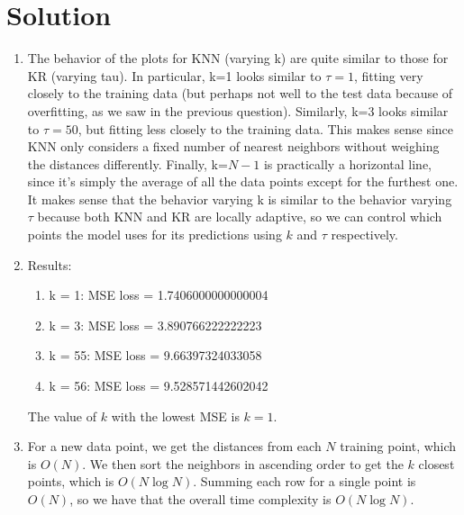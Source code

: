 \documentclass[submit]{harvardml}
\newenvironment{solution}
  {\color{magenta}\section*{Solution}}
{}
\begin{document}
\begin{solution}
\begin{enumerate}
    \item The behavior of the plots for KNN (varying k) are quite similar to those for KR (varying tau). In particular, k=1 looks similar to $\tau=1$, fitting very closely to the training data (but perhaps not well to the test data because of overfitting, as we saw in the previous question). Similarly, k=3 looks similar to $\tau = 50$, but fitting less closely to the training data. This makes sense since KNN only considers a fixed number of nearest neighbors without weighing the distances differently. Finally, k=$N-1$ is practically a horizontal line, since it's simply the average of all the data points except for the furthest one. It makes sense that the behavior varying k is similar to the behavior varying $\tau$ because both KNN and KR are locally adaptive, so we can control which points the model uses for its predictions using $k$ and $\tau$ respectively.

    \item Results: 
    \begin{enumerate}
        \item k = 1: MSE loss = 1.7406000000000004
        \item k = 3: MSE loss = 3.890766222222223
        \item k = 55: MSE loss = 9.66397324033058
        \item k = 56: MSE loss = 9.528571442602042
    \end{enumerate}
    The value of $k$ with the lowest MSE is $k=1$. 

    \item For a new data point, we get the distances from each $N$ training point, which is $O(N)$. We then sort the neighbors in ascending order to get the $k$ closest points, which is $O(N \log N)$. Summing each row for a single point is $O(N)$, so we have that the overall time complexity is $O(N \log N)$. 
\end{enumerate}
\end{solution}


\end{document}
